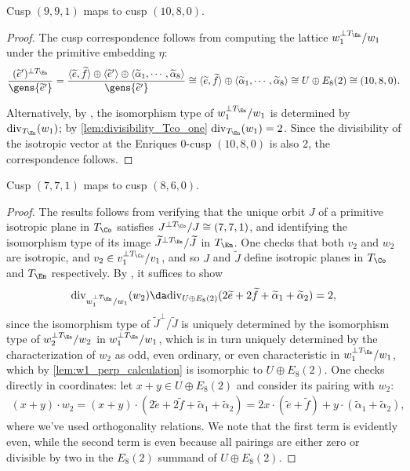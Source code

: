 \documentclass[../../main.tex]{subfiles}
\begin{document}
\begin{lemma}\label{lem:w1_perp_calculation}
Cusp $(9,9,1)$ maps to cusp $(10, 8, 0)$.
\end{lemma}

\begin{proof}
The cusp correspondence follows from computing the lattice $w_1^{\perp T_{\En}}/w_1$ under the primitive embedding $\eta$:
\[
{(\tilde e')^{\perp T_\En} \over \gens{\tilde e'}} =
{ 
\langle\tilde{e}, \tilde{f}\rangle
\oplus
\left\langle\tilde{e}^{\prime}\right\rangle
\oplus
\left\langle\tilde{\alpha}_{1}, \cdots, \tilde{\alpha}_{8} \right\rangle
\over 
\gens{ \tilde{e}^{\prime} }}\cong\langle\tilde{e}, \tilde{f}\rangle \oplus\left\langle
\tilde{\alpha}_{1},\cdots, \tilde{\alpha}_{8}
\right\rangle \cong U \oplus E_{8}(2) \cong (10,8,0)
.\]

Alternatively, by \cite[Prop. 5.5]{AE22}, the isomorphism type of $w_1^{\perp T_{\En}}/w_1$ is determined by $\mathrm{div}_{T_\En}(w_1)$; by \cref{lem:divisibility_Tco_one} $\mathrm{div}_{T_\En}(w_1) = 2$. Since the divisibility of the isotropic vector at the Enriques 0-cusp $(10, 8, 0)$ is also 2, the correspondence follows.
\end{proof}

\begin{lemma}\label{lem:1_cusp_correspondence}
Cusp $(7,7,1)$ maps to cusp $(8, 6, 0)$.
\end{lemma}

\begin{proof}

The results follows from verifying that the unique orbit $J$ of a primitive isotropic plane in $T_\Co$ satisfies $J^{\perp T_\Co}/J \cong (7,7,1)$, and identifying the isomorphism type of its image $\tilde J^{\perp T_\En}/\tilde J$ in $T_\En$.
One checks that both $v_2$ and $w_2$ are isotropic, and $v_2 \in v_1^{\perp T_\Co}/v_1$, and so $J$ and $\tilde J$ define isotropic planes in $T_\Co$ and $T_\En$ respectively. By \cite[Prop. 5.5, Lem. 5.9]{AE22}, it suffices to show
\[
\mathrm{div}_{w_1^{\perp T_\En} /w_1}(w_2)  \da \mathrm{div}_{U \oplus E_8(2)}(2\tilde e + 2\tilde f + \tilde \alpha_1 + \tilde \alpha_2)= 2
,\]
since the isomorphism type of $\tilde J^\perp/\tilde J$ is uniquely determined by the isomorphism type of $w_2^{\perp T_\En}/w_2$ in $w_1^{\perp T_\En}/w_1$, which is in turn uniquely determined by the characterization of $w_2$ as odd, even ordinary, or even characteristic in $w_1^{\perp T_\En}/w_1$, which by \cref{lem:w1_perp_calculation} is isomorphic to $U \oplus E_8(2)$. One checks directly in coordinates: let $x+y\in U \oplus E_8(2)$ and consider its pairing with $w_2$:
\begin{align*}
(x+y)\cdot w_2 
= (x+y)\cdot (2\tilde e + 2\tilde f + \tilde \alpha_1 + \tilde \alpha_2 )
= 2x\cdot (\tilde e + \tilde f) + y\cdot (\tilde \alpha_1 + \tilde \alpha_2)
,\end{align*}
where we've used orthogonality relations. We note that the first term is evidently even, while the second term is even because all pairings are either zero or divisible by two in the $E_8(2)$ summand of $U \oplus E_8(2)$.
\end{proof}
\end{document}
